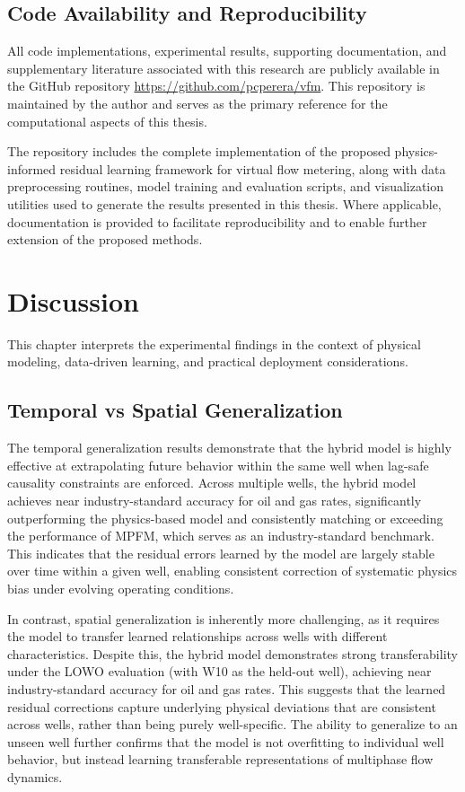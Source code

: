 \documentclass[12pt,APA]{uomthesis}
\begin{document}
\section{Code Availability and Reproducibility}
\label{sec:reproducibility}
All code implementations, experimental results, supporting documentation, and supplementary literature associated with this research are publicly available in the GitHub repository \url{https://github.com/pcperera/vfm}. 
This repository is maintained by the author and serves as the primary reference for the computational aspects of this thesis.

The repository includes the complete implementation of the proposed physics-informed residual learning framework for virtual flow metering, along with data preprocessing routines, model training and evaluation scripts, and visualization utilities used to generate the results presented in this thesis. Where applicable, documentation is provided to facilitate reproducibility and to enable further extension of the proposed methods.

\chapter{Discussion}
\label{ch:dicussion}

This chapter interprets the experimental findings in the context of physical modeling, data-driven learning, and practical deployment considerations.

\section{Temporal vs Spatial Generalization}
The temporal generalization results demonstrate that the hybrid model is highly effective at extrapolating future behavior within the same well when lag-safe causality constraints are enforced. Across multiple wells, the hybrid model achieves near industry-standard accuracy for oil and gas rates, significantly outperforming the physics-based model and consistently matching or exceeding the performance of MPFM, which serves as an industry-standard benchmark. This indicates that the residual errors learned by the model are largely stable over time within a given well, enabling consistent correction of systematic physics bias under evolving operating conditions.

In contrast, spatial generalization is inherently more challenging, as it requires the model to transfer learned relationships across wells with different characteristics. Despite this, the hybrid model demonstrates strong transferability under the LOWO evaluation (with W10 as the held-out well), achieving near industry-standard accuracy for oil and gas rates. This suggests that the learned residual corrections capture underlying physical deviations that are consistent across wells, rather than being purely well-specific. The ability to generalize to an unseen well further confirms that the model is not overfitting to individual well behavior, but instead learning transferable representations of multiphase flow dynamics.
\end{document}
